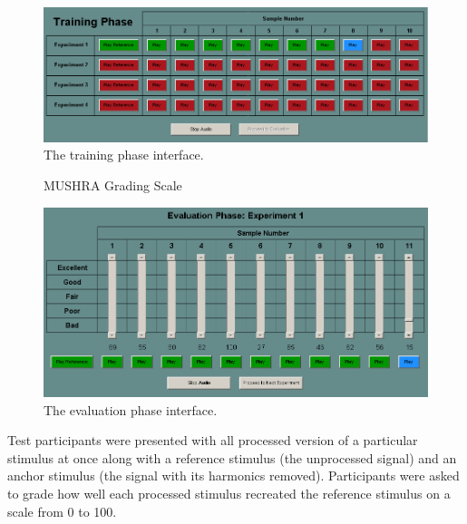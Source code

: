 			\begin{figure}[h!]
				\centering
				\includegraphics[width=\textwidth]{chapter7/Images/MushraTraining.png}
				\caption{The training phase interface.}
				\label{fig:MushraTraining}
			\end{figure}

			\begin{figure}[h!]
				\centering
				\caption{MUSHRA Grading Scale}
				\label{fig:MushraScale}
			\end{figure}

			\begin{figure}[h!]
				\centering
				\includegraphics[width=\textwidth]{chapter7/Images/MushraEvaluation.png}
				\caption{The evaluation phase interface.}
				\label{fig:MushraEvaluation}
			\end{figure}

			Test participants were presented with all processed version of a particular stimulus at once along
			with a reference stimulus (the unprocessed signal) and an anchor stimulus (the signal with its
			harmonics removed). Participants were asked to grade how well each processed stimulus recreated the
			reference stimulus on a scale from 0 to 100.

